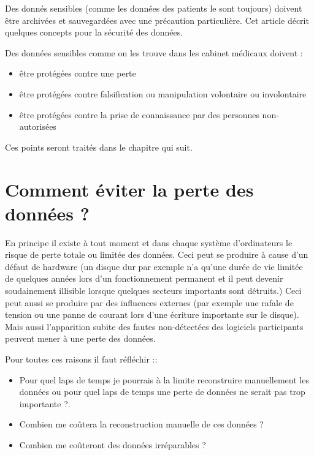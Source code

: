 %

\label{sicherheit}
Des donnés sensibles (comme les données des patients le sont toujours) doivent être archivées et sauvegardées avec une précaution particulière. Cet article décrit quelques concepts pour la sécurité des données.

Des données sensibles comme on les trouve dans les cabinet médicaux doivent :
\begin{itemize}
  \item{être protégées contre une perte}
  \item{être protégées contre falsification ou manipulation volontaire ou involontaire }
  \item {être protégées contre la prise de connaissance par des personnes non-autorisées}
\end{itemize}

Ces points seront traités dans le chapitre qui suit.

\section{Comment éviter la perte des données ? }
En principe il existe à tout moment et dans chaque système d'ordinateurs le risque de perte totale ou limitée des données. Ceci peut se produire à cause d'un défaut de hardware (un disque dur par exemple n'a qu'une durée de vie limitée de quelques années lors d'un fonctionnement permanent et il peut devenir soudainement illisible lorsque quelques secteurs importants sont détruits.) Ceci peut aussi se produire par des influences externes (par exemple une rafale de tension ou une panne de courant lors d'une écriture importante sur le disque). Mais aussi l'apparition subite des fautes non-détectées des logiciels participants peuvent mener à une perte des données.

Pour toutes ces raisons il faut réfléchir ::
\begin{itemize}
  \item {Pour quel laps de temps je pourrais à la limite reconstruire manuellement les données ou pour quel laps de temps une perte de données ne serait pas trop importante ?.}
  \item {Combien me coûtera la reconstruction manuelle de ces données ?}
  \item {Combien me coûteront des données irréparables ?}
\end{itemize}


